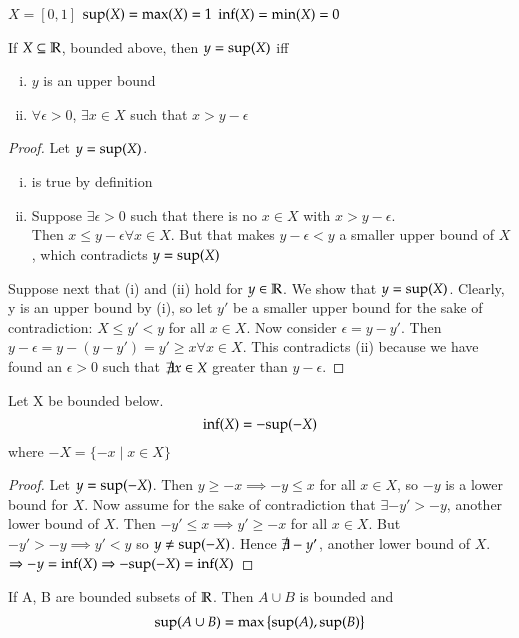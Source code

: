 $X = [0,1]$ \qquad
$\mathrm{sup}(X) = \mathrm{max}(X) = 1$ \qquad
$\mathrm{inf}(X) = \mathrm{min}(X) = 0$

\begin{proposition}
	If $X\subseteq \mathbb{R}$, bounded above, then $y = \mathrm{sup}(X)$ iff
	\begin{enumerate}[(i)]
		\item $y$ is an upper bound
		\item $\forall \epsilon > 0$, $\exists x\in X$ such that $x>y-\epsilon$
	\end{enumerate}
\end{proposition}
\begin{proof}
Let $y = \mathrm{sup}(X)$. \begin{enumerate}[(i)]
\item is true by definition
\item Suppose $\exists \epsilon > 0$ such that there is no $x\in X$ with $x>y-\epsilon$. \\
Then $x\leq y-\epsilon \forall x\in X$. But that makes $y-\epsilon < y$ a smaller upper bound of $X$, which contradicts $y=\mathrm{sup}(X)$
\end{enumerate}

Suppose next that (i) and (ii) hold for $y\in \mathbb{R}$. We show that $y = \mathrm{sup}(X)$. Clearly, y is an upper bound by (i), so let $y'$ be a smaller upper bound for the sake of contradiction: $X\leq y' < y$ for all $x\in X$. Now consider $\epsilon = y-y'$. Then $y-\epsilon = y- (y-y') = y' \geq x \forall x\in X$. This contradicts (ii) because we have found an $\epsilon > 0$ such that $\not \exists x \in X$ greater than $y-\epsilon$.
\end{proof}

\begin{proposition}
	Let X be bounded below.
	\begin{equation}
		\mathrm{inf}(X) = -\mathrm{sup}(-X)
	\end{equation}
	where $-X = \{-x \mid x\in X\}$
\end{proposition}

\begin{proof}
	Let $y = \mathrm{sup} (-X)$. Then $y \geq -x \implies -y \leq x$ for all $x\in X$, so $-y$ is a lower bound for $X$. Now assume for the sake of contradiction that $\exists -y' > -y$, another lower bound of $X$. Then $-y' \leq x \implies y' \geq -x$ for all $x\in X$. But $-y' > -y \implies y' < y$ so $y \neq \mathrm{sup}(-X)$. Hence $\not \exists -y'$, another lower bound of $X$. $\Rightarrow -y = \mathrm{inf}(X) \Rightarrow -\mathrm{sup}(-X) = \mathrm{inf}(X)$
\end{proof}

\begin{proposition}\label{1.5}
	If A, B are bounded subsets of $\mathbb{R}$. Then $A\cup B$ is bounded and
	\begin{equation}
		\mathrm{sup}(A\cup B) = \mathrm{max}\left\{ \mathrm{sup}(A), \mathrm{sup}(B) \right\}
	\end{equation}
\end{proposition}
